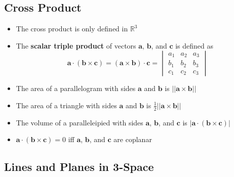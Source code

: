 \documentclass{article}
\begin{document}
\subsection{Cross Product}

\begin{itemize}
  \item The cross product is only defined in $\mathbb{R}^3$

  \item The \textbf{scalar triple product} of vectors $\mathbf{a}$, $\mathbf{b}$, and $\mathbf{c}$ is defined as \[\mathbf{a} \cdot (\mathbf{b} \times \mathbf{c}) = (\mathbf{a} \times \mathbf{b}) \cdot \mathbf{c} = \begin{vmatrix}
            a_1 & a_2 & a_3 \\
            b_1 & b_2 & b_3 \\
            c_1 & c_2 & c_3
          \end{vmatrix}\]

  \item The area of a parallelogram with sides $\mathbf{a}$ and $\mathbf{b}$ is $||\mathbf{a} \times \mathbf{b}||$

  \item The area of a triangle with sides $\mathbf{a}$ and $\mathbf{b}$ is $\frac{1}{2} ||\mathbf{a} \times \mathbf{b}||$

  \item The volume of a paralleleipied with sides $\mathbf{a}$, $\mathbf{b}$, and $\mathbf{c}$ is $|\mathbf{a} \cdot (\mathbf{b} \times \mathbf{c})|$

  \item $\mathbf{a} \cdot (\mathbf{b} \times \mathbf{c}) = 0$ iff $\mathbf{a}$, $\mathbf{b}$, and $\mathbf{c}$ are coplanar
\end{itemize}

\subsection{Lines and Planes in 3-Space}
\end{document}
